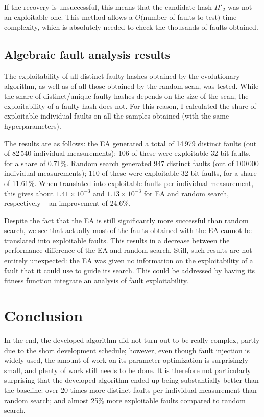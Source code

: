 \documentclass[times, utf8, diplomski]{fer}
\begin{document}
If the recovery is unsuccessful, this means that the candidate hash $H'_2$ was
not an exploitable one. This method allows a $O($number of faults to test$)$
time complexity, which is absolutely needed to check the thousands of faults
obtained.


\section{Algebraic fault analysis results}
The exploitability of all distinct faulty hashes obtained by the evolutionary
algorithm, as well as of all those obtained by the random scan, was tested.
While the share of distinct/unique faulty hashes depends on the size of the scan,
the exploitability of a faulty hash does not. For this reason, I calculated the
share of exploitable individual faults on all the samples obtained (with the
same hyperparameters).


The results are as follows:
the EA generated a total of 14\,979 distinct faults (out of 82\,540 individual
measurements); 106 of these were exploitable 32-bit faults, for a share of 0.71\%.
Random search generated 947 distinct faults (out of 100\,000 individual
measurements); 110 of these were exploitable 32-bit faults, for a share of 11.61\%.
When translated into exploitable faults per individual measurement, this gives
about $1.41 \times 10^{-3}$ and $1.13 \times 10^{-3}$ for EA and random
search, respectively -- an improvement of 24.6\%.

Despite the fact that the EA is still significantly more successful than random search,
we see that actually most of the faults obtained with the EA cannot be translated into
exploitable faults. This results in a decrease between the performance difference
of the EA and random search. Still, such results are not entirely unexpected:
the EA was given no information on the exploitability of a fault that it could
use to guide its search. This could be addressed by having its fitness function
integrate an analysis of fault exploitability.



\chapter{Conclusion}\label{ch:conclusion}
In the end, the developed algorithm did not turn out to be really complex,
partly due to the short development schedule; however, even though fault injection
is widely used, the amount of work on its parameter optimization is surprisingly
small, and plenty of work still needs to be done. It is therefore not particularly
surprising that the developed algorithm ended up being substantially better than
the baseline: over 20 times more distinct faults per individual measurement than
random search; and almost 25\% more exploitable faults compared to random search.
\end{document}
